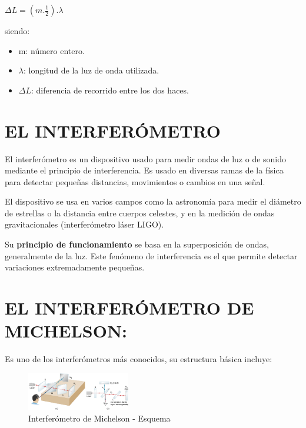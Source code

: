 \documentclass[a4paper]{article}
\begin{document}
		\begin{center}
			$\Delta L = (m . {\frac{1}{2}}) . \lambda$
		\end{center}
		
		siendo:
		\begin{itemize}
			\item m: número entero.
			\item $\lambda$: longitud de la luz de onda utilizada.
			\item $\Delta L$: diferencia de recorrido entre los dos haces.
		\end{itemize} 
		
		
		\section{EL INTERFERÓMETRO}
		
		\indent El interferómetro es un dispositivo usado para medir ondas de luz o de sonido mediante el principio de interferencia. Es usado en diversas ramas de la física para detectar pequeñas distancias, movimientos o cambios en una señal.
		
		\indent El dispositivo se usa en varios campos como la astronomía para medir el diámetro de estrellas o la distancia entre cuerpos celestes, y en la medición de ondas gravitacionales (interferómetro láser LIGO).
		
		\indent Su \textbf{principio de funcionamiento} se basa en la superposición de ondas, generalmente de la luz. Este fenómeno de interferencia es el que permite detectar variaciones extremadamente pequeñas.
		
		\section{EL INTERFERÓMETRO DE MICHELSON:}
		
		\indent Es uno de los interferómetros más conocidos, su estructura básica incluye: 
		
		\begin{figure}[h!]
			\centering
			\includegraphics[width=0.4\textwidth]{../imagenes/interferometroDibujoCompleto.jpg}
			\caption{Interferómetro de Michelson - Esquema}
			\label{fig:interferometro2}
		\end{figure}
		
\end{document}
